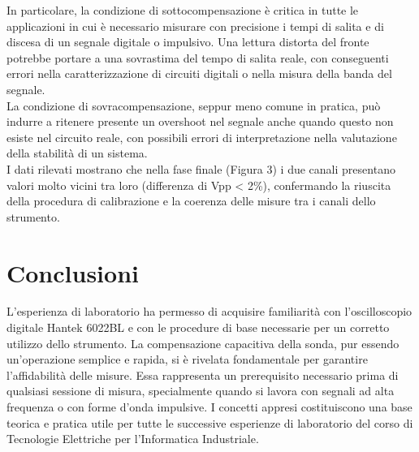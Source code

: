 \documentclass{article}
\begin{document}
\noindent In particolare, la condizione di sottocompensazione è critica in tutte le applicazioni in cui è necessario misurare con
precisione i tempi di salita e di discesa di un segnale digitale o impulsivo. Una lettura distorta del fronte potrebbe portare
a una sovrastima del tempo di salita reale, con conseguenti errori nella caratterizzazione di circuiti digitali o nella misura
della banda del segnale. \\

\noindent La condizione di sovracompensazione, seppur meno comune in pratica, può indurre a ritenere presente
un overshoot nel segnale anche quando questo non esiste nel circuito reale, con possibili errori di interpretazione nella valutazione
della stabilità di un sistema. \\

\noindent I dati rilevati mostrano che nella fase finale (Figura 3) i due canali presentano valori molto vicini tra loro
(differenza di Vpp < 2\%), confermando la riuscita della procedura di calibrazione e la coerenza delle misure tra i canali dello strumento.

\section{Conclusioni}
L'esperienza di laboratorio ha permesso di acquisire familiarità con l'oscilloscopio digitale Hantek 6022BL e con le procedure di base necessarie per un corretto utilizzo dello strumento.
La compensazione capacitiva della sonda, pur essendo un'operazione semplice e rapida, si è rivelata fondamentale per garantire l'affidabilità delle misure. Essa rappresenta un prerequisito necessario prima di qualsiasi sessione di misura, specialmente quando si lavora con segnali ad alta frequenza o con forme d'onda impulsive.
I concetti appresi costituiscono una base teorica e pratica utile per tutte le successive esperienze di laboratorio del corso di Tecnologie Elettriche per l'Informatica Industriale.

\newpage
\end{document}
